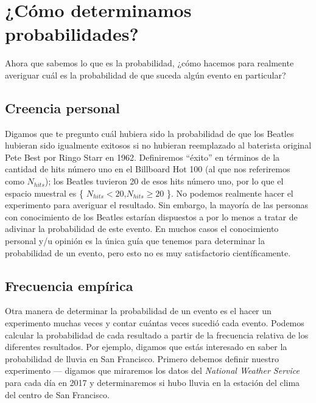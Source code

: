 \documentclass[
  12pt,
]{book}
\begin{document}
\hypertarget{cuxf3mo-determinamos-probabilidades}{%
\section{¿Cómo determinamos probabilidades?}\label{cuxf3mo-determinamos-probabilidades}}

Ahora que sabemos lo que es la probabilidad, ¿cómo hacemos para realmente averiguar cuál es la probabilidad de que suceda algún evento en particular?

\hypertarget{creencia-personal}{%
\subsection{Creencia personal}\label{creencia-personal}}

Digamos que te pregunto cuál hubiera sido la probabilidad de que los Beatles hubieran sido igualmente exitosos si no hubieran reemplazado al baterista original Pete Best por Ringo Starr en 1962. Definiremos ``éxito'' en términos de la cantidad de hits número uno en el Billboard Hot 100 (al que nos referiremos como \(N_{hits}\)); los Beatles tuvieron 20 de esos hits número uno, por lo que el espacio muestral es \{ \(N_{hits} < 20\),\(N_{hits} \ge 20\) \}. No podemos realmente hacer el experimento para averiguar el resultado. Sin embargo, la mayoría de las personas con conocimiento de los Beatles estarían dispuestos a por lo menos a tratar de adivinar la probabilidad de este evento. En muchos casos el conocimiento personal y/u opinión es la única guía que tenemos para determinar la probabilidad de un evento, pero esto no es muy satisfactorio científicamente.

\hypertarget{empirical-frequency}{%
\subsection{Frecuencia empírica}\label{empirical-frequency}}

Otra manera de determinar la probabilidad de un evento es el hacer un experimento muchas veces y contar cuántas veces sucedió cada evento. Podemos calcular la probabilidad de cada resultado a partir de la frecuencia relativa de los diferentes resultados. Por ejemplo, digamos que estás interesado en saber la probabilidad de lluvia en San Francisco. Primero debemos definir nuestro experimento --- digamos que miraremos los datos del \emph{National Weather Service} para cada día en 2017 y determinaremos si hubo lluvia en la estación del clima del centro de San Francisco.
\end{document}
